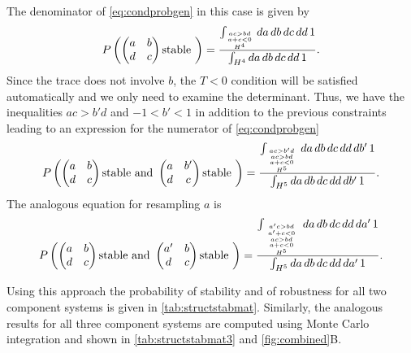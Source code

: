The denominator of \ref{eq:condprobgen} in this case is given by
\begin{align*}
P\left(\begin{pmatrix}
a & b \\
d & c
\end{pmatrix} \textrm{stable } \right) = \frac{\int_{\genfrac{}{}{0pt}{}{\genfrac{}{}{0pt}{}{ac>bd}{a+c<0}}{H^4}} da\,db\,dc\,dd\,1}{\int_{H^4} da\,db\,dc\,dd\,1}.
\end{align*}
Since the trace does not involve $b$, the $T<0$ condition will be satisfied automatically and we only need to examine the determinant. Thus, we have the inequalities $ac > b'd$ and $-1 < b' < 1$ in addition to the previous constraints leading to an expression for the numerator of \ref{eq:condprobgen}
\begin{align*}
P\left(\begin{pmatrix}
a & b \\
d & c
\end{pmatrix} \textrm{stable and } \begin{pmatrix}
a & b' \\
d & c
\end{pmatrix} \textrm{stable } \right) = \frac{\int_{{{ac>b'd \atop ac>bd} \atop a+c<0} \atop H^5} da\,db\,dc\,dd\,db'\,1}{\int_{H^5} da\,db\,dc\,dd\,db'\,1}.
\end{align*}
The analogous equation for resampling $a$ is
\begin{align*}
P\left(\begin{pmatrix}
a & b \\
d & c
\end{pmatrix} \textrm{stable and } \begin{pmatrix}
a' & b \\
d & c
\end{pmatrix} \textrm{stable } \right) = \frac{\int_{{{{a'c>bd \atop a' + c < 0} \atop ac>bd} \atop a+c<0} \atop H^5} da\,db\,dc\,dd\,da'\,1}{\int_{H^5} da\,db\,dc\,dd\,da'\,1}.
\end{align*}

Using this approach the probability of stability and of robustness for all two component systems is given in \ref{tab:structstabmat}. Similarly, the analogous results for all three component systems are computed using Monte Carlo integration and shown in \ref{tab:structstabmat3} and \ref{fig:combined}B.



